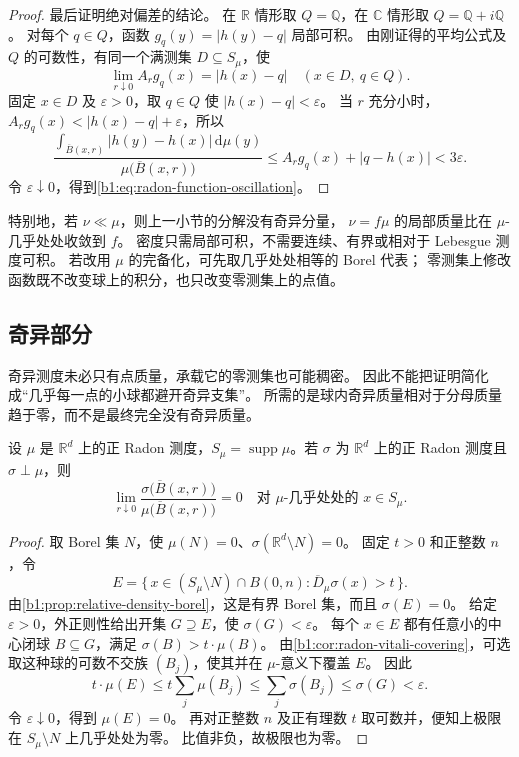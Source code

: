 \begin{proof}
最后证明绝对偏差的结论。
在 \(\mathbb R\) 情形取 \(Q=\mathbb Q\)，在 \(\mathbb C\) 情形取 \(Q=\mathbb Q+i\mathbb Q\)。
对每个 \(q\in Q\)，函数 \(g_q(y)=|h(y)-q|\) 局部可积。
由刚证得的平均公式及 \(Q\) 的可数性，有同一个满测集 \(D\subseteq S_\mu\)，使
\[
 \lim_{r\downarrow0}A_rg_q(x)=|h(x)-q|
 \quad(x\in D,\ q\in Q).
\]
固定 \(x\in D\) 及 \(\varepsilon>0\)，取 \(q\in Q\) 使 \(|h(x)-q|<\varepsilon\)。
当 \(r\) 充分小时，\(A_rg_q(x)<|h(x)-q|+\varepsilon\)，所以
\[
 \frac{\int_{\overline B(x,r)}|h(y)-h(x)|\,\mathrm d\mu(y)}
      {\mu\bigl(\overline B(x,r)\bigr)}
 \leq A_rg_q(x)+|q-h(x)|<3\varepsilon.
\]
令 \(\varepsilon\downarrow0\)，得到\eqref{b1:eq:radon-function-oscillation}。
\end{proof}

特别地，若 \(\nu\ll\mu\)，则上一小节的分解没有奇异分量，
\(\nu=f\mu\) 的局部质量比在 \(\mu\)-几乎处处收敛到 \(f\)。
密度只需局部可积，不需要连续、有界或相对于 Lebesgue 测度可积。
若改用 \(\mu\) 的完备化，可先取几乎处处相等的 Borel 代表；
零测集上修改函数既不改变球上的积分，也只改变零测集上的点值。

\subsection{奇异部分}
\label{b1:subsec:140303}

奇异测度未必只有点质量，承载它的零测集也可能稠密。
因此不能把证明简化成“几乎每一点的小球都避开奇异支集”。
所需的是球内奇异质量相对于分母质量趋于零，而不是最终完全没有奇异质量。

\begin{theorem}\label{b1:thm:radon-singular-differentiation}
设 \(\mu\) 是 \(\mathbb R^d\) 上的正 Radon 测度，\(S_\mu=\operatorname{supp}\mu\)。若 \(\sigma\) 为 \(\mathbb R^d\) 上的正 Radon 测度且 \(\sigma\perp\mu\)，则
\[
 \lim_{r\downarrow0}
 \frac{\sigma\bigl(\overline B(x,r)\bigr)}
      {\mu\bigl(\overline B(x,r)\bigr)}=0
 \quad\text{对 }\mu\text{-几乎处处的 }x\in S_\mu.
\]
\end{theorem}
\begin{proof}
取 Borel 集 \(N\)，使 \(\mu(N)=0\)、\(\sigma(\mathbb R^d\setminus N)=0\)。
固定 \(t>0\) 和正整数 \(n\)，令
\[
 E=\{\,x\in(S_\mu\setminus N)\cap B(0,n):
              \overline D_\mu\sigma(x)>t\,\}.
\]
由\cref{b1:prop:relative-density-borel}，这是有界 Borel 集，而且 \(\sigma(E)=0\)。
给定 \(\varepsilon>0\)，外正则性给出开集 \(G\supseteq E\)，使 \(\sigma(G)<\varepsilon\)。
每个 \(x\in E\) 都有任意小的中心闭球 \(B\subseteq G\)，满足 \(\sigma(B)>t\cdot\mu(B)\)。
由\cref{b1:cor:radon-vitali-covering}，可选取这种球的可数不交族 \((B_j)\)，使其并在 \(\mu\)-意义下覆盖 \(E\)。
因此
\[
 t\cdot\mu(E)\leq t\sum_j\mu(B_j)
 \leq\sum_j\sigma(B_j)
 \leq\sigma(G)<\varepsilon.
\]
令 \(\varepsilon\downarrow0\)，得到 \(\mu(E)=0\)。
再对正整数 \(n\) 及正有理数 \(t\) 取可数并，便知上极限在 \(S_\mu\setminus N\) 上几乎处处为零。
比值非负，故极限也为零。
\end{proof}

